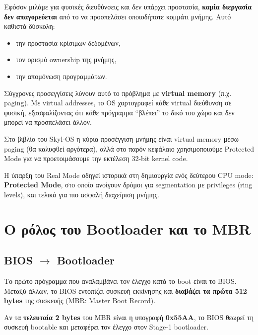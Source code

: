 \documentclass[18pt]{extarticle}
\begin{document}
Εφόσον μιλάμε για φυσικές διευθύνσεις και δεν υπάρχει προστασία, \textbf{καμία διεργασία δεν
απαγορεύεται} από το να προσπελάσει οποιοδήποτε κομμάτι μνήμης. Αυτό καθιστά δύσκολη:
\begin{itemize}
    \item την προστασία κρίσιμων δεδομένων,
    \item τον ορισμό ownership της μνήμης,
    \item την απομόνωση προγραμμάτων.
\end{itemize}

Σύγχρονες προσεγγίσεις λύνουν αυτό το πρόβλημα με \textbf{virtual memory} (π.χ. paging).
Με virtual addresses, το OS χαρτογραφεί κάθε virtual διεύθυνση σε φυσική, εξασφαλίζοντας ότι
κάθε πρόγραμμα “βλέπει” το δικό του χώρο και δεν μπορεί να προσπελάσει άλλον.

\begin{info}[Σημείωση]
Στο βιβλίο του Skyl-OS η κύρια προσέγγιση μνήμης είναι virtual memory μέσω paging (θα καλυφθεί αργότερα),
αλλά στο παρόν κεφάλαιο χρησιμοποιούμε Protected Mode για να προετοιμάσουμε την εκτέλεση 32-bit kernel code.
\end{info}

Η ύπαρξη του Real Mode οδηγεί ιστορικά στη δημιουργία ενός δεύτερου CPU mode: \textbf{Protected Mode},
στο οποίο ανοίγουν δρόμοι για segmentation με privileges (ring levels), και τελικά για πιο ασφαλή
διαχείριση μνήμης.


\section{Ο ρόλος του Bootloader και το MBR}

\subsection{BIOS $\rightarrow$ Bootloader}

Το πρώτο πρόγραμμα που αναλαμβάνει τον έλεγχο κατά το boot είναι το BIOS.
Μεταξύ άλλων, το BIOS εντοπίζει συσκευή εκκίνησης και \textbf{διαβάζει τα πρώτα 512 bytes} της
συσκευής (MBR: Master Boot Record).

Αν τα \textbf{τελευταία 2 bytes} του MBR είναι η υπογραφή \textbf{0x55AA}, το BIOS θεωρεί τη συσκευή
bootable και μεταφέρει τον έλεγχο στον Stage-1 bootloader.
\end{document}
